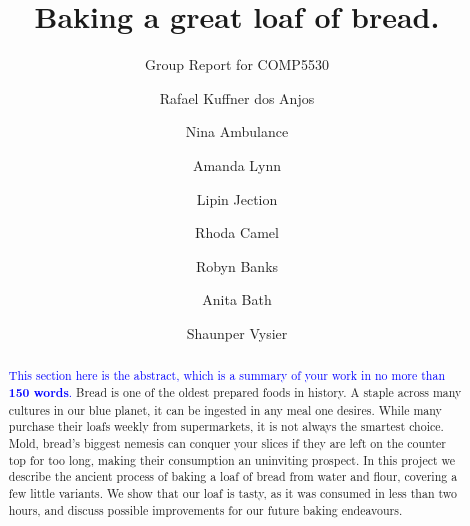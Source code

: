 \documentclass[acmtog, nonacm]{acmart}
\begin{document}
\title{Baking a great loaf of bread.}
\subtitle{Group Report for COMP5530}

\author{Rafael Kuffner dos Anjos}
\author{Nina Ambulance}
\authornotemark[1]
\author{Amanda Lynn}
\authornotemark[1]
\author{Lipin Jection}
\authornotemark[1]
\author{Rhoda Camel}
\authornotemark[1]
\author{Robyn Banks}
\authornotemark[1]
\author{Anita Bath}
\authornotemark[1]

\author{Shaunper Vysier}

  

\begin{abstract}
  \textcolor{blue}{This section here is the abstract, which is a summary of your work in no more than \textbf{150 words}.}
  Bread is one of the oldest prepared foods in history.
  A staple across many cultures in our blue planet, it can be ingested in any meal one desires. 
  While many purchase their loafs weekly from supermarkets, it is not always the smartest choice. 
  Mold, bread's biggest nemesis can conquer your slices if they are left on the counter top for too long, making their consumption an uninviting prospect. 
  In this project we describe the ancient process of baking a loaf of bread from water and flour, covering a few little variants.
  We show that our loaf is tasty, as it was consumed in less than two hours, and discuss possible improvements for our future baking endeavours.  
\end{abstract}
\end{document}
